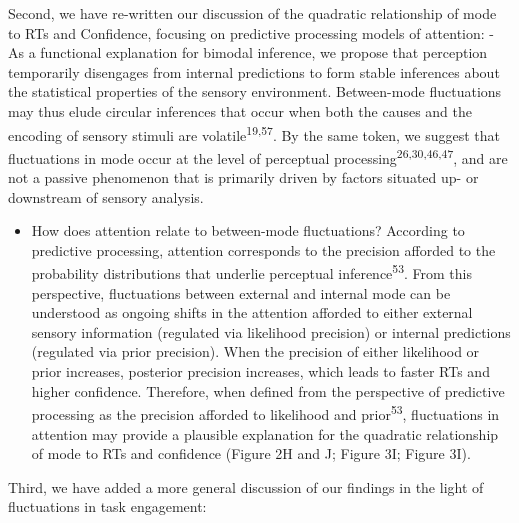 \documentclass[
]{article}
\providecommand{\tightlist}{%
  \setlength{\itemsep}{0pt}\setlength{\parskip}{0pt}}
\begin{document}
Second, we have re-written our discussion of the quadratic relationship
of mode to RTs and Confidence, focusing on predictive processing models
of attention: - As a functional explanation for bimodal inference, we
propose that perception temporarily disengages from internal predictions
to form stable inferences about the statistical properties of the
sensory environment. Between-mode fluctuations may thus elude circular
inferences that occur when both the causes and the encoding of sensory
stimuli are volatile\textsuperscript{19,57}. By the same token, we
suggest that fluctuations in mode occur at the level of perceptual
processing\textsuperscript{26,30,46,47}, and are not a passive
phenomenon that is primarily driven by factors situated up- or
downstream of sensory analysis.

\begin{itemize}
\tightlist
\item
  How does attention relate to between-mode fluctuations? According to
  predictive processing, attention corresponds to the precision afforded
  to the probability distributions that underlie perceptual
  inference\textsuperscript{53}. From this perspective, fluctuations
  between external and internal mode can be understood as ongoing shifts
  in the attention afforded to either external sensory information
  (regulated via likelihood precision) or internal predictions
  (regulated via prior precision). When the precision of either
  likelihood or prior increases, posterior precision increases, which
  leads to faster RTs and higher confidence. Therefore, when defined
  from the perspective of predictive processing as the precision
  afforded to likelihood and prior\textsuperscript{53}, fluctuations in
  attention may provide a plausible explanation for the quadratic
  relationship of mode to RTs and confidence (Figure 2H and J; Figure
  3I; Figure 3I).
\end{itemize}

Third, we have added a more general discussion of our findings in the
light of fluctuations in task engagement:
\end{document}
